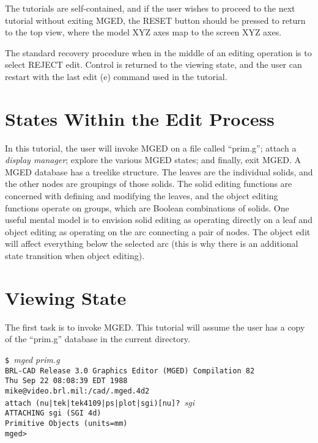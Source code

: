 The tutorials are self-contained, and if the user wishes to proceed to
the next tutorial without exiting MGED,
the RESET button should be pressed
to return to the top view, where the model XYZ axes
map to the screen XYZ axes.

The standard recovery procedure when in the middle of an editing operation
is to select REJECT edit.  Control is
returned to the viewing state, and the user can restart with the last edit (e)
command used in the tutorial.

\section{States Within the Edit Process}

In this tutorial, the user will invoke MGED on a file called ``prim.g'';
attach a {\sl display manager\/}; explore the various MGED states;
and finally, exit MGED.  A MGED database has a treelike structure.  The
leaves are the individual solids, and the other nodes are groupings
of those solids.  The solid editing functions are concerned with defining
and modifying the leaves, and the object editing functions operate
on groups, which are Boolean combinations of solids.  One useful mental
model is to envision solid editing as operating directly on a leaf and
object editing as operating on the arc connecting a pair of nodes.  The
object edit will affect everything below the selected arc (this is why
there is an additional state transition when object editing).

\section{Viewing State}

The first task is to invoke MGED.  This tutorial will assume the user
has a copy of the ``prim.g'' database in the current directory.

\noindent
{\tt \$ }{\em mged prim.g}\\
{\tt BRL-CAD Release 3.0 Graphics Editor (MGED) Compilation 82}\\
{\tt Thu Sep 22 08:08:39 EDT 1988}\\
{\tt mike@video.brl.mil:/cad/.mged.4d2}\\

\noindent
{\tt attach (nu|tek|tek4109|ps|plot|sgi)[nu]? }{\em sgi}\\
{\tt ATTACHING sgi (SGI 4d)}\\
{\tt Primitive Objects (units=mm)}\\
{\tt mged> }\\

